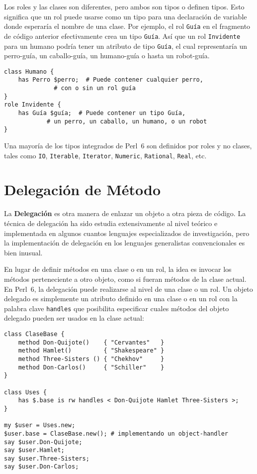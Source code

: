 Los roles y las clases son diferentes, pero ambos son tipos
o definen tipos. Esto significa que un rol puede usarse como
un tipo para una declaración de variable donde esperaría el 
nombre de una clase. Por ejemplo, el rol {\tt Guía} en el fragmento
de código anterior efectivamente crea un tipo {\tt Guía}. Así que
un rol {\tt Invidente} para un humano podría tener un atributo
de tipo {\tt Guía}, el cual representaría un perro-guía, un 
caballo-guía, un humano-guía o hasta un robot-guía.

\begin{verbatim}
class Humano {
    has Perro $perro;  # Puede contener cualquier perro,
    		  # con o sin un rol guía
}
role Invidente {
    has Guía $guía;  # Puede contener un tipo Guía, 
    	  	# un perro, un caballo, un humano, o un robot
}
\end{verbatim}


Una mayoría de los tipos integrados de Perl~6 son definidos
por roles y no clases, tales como {\tt IO}, {\tt Iterable}, 
{\tt Iterator}, {\tt Numeric}, {\tt Rational}, {\tt Real},
etc.

\section{Delegación de Método}


La {\bf Delegación} es otra manera de enlazar un objeto a otra pieza 
de código. La técnica de delegación ha sido estudia extensivamente 
al nivel teórico e implementada en algunos cuantos lenguajes 
especializados de investigación, pero la implementación de
delegación en los lenguajes generalistas convencionales
es bien inusual.

En lugar de definir métodos en una clase o en un rol, la idea 
es invocar los métodos perteneciente a otro objeto, como si fueran
métodos de la clase actual. En Perl~6, la delegación puede realizarse
al nivel de una clase o un rol. Un objeto delegado es simplemente
un atributo definido en una clase o en un rol con la palabra clave
{\tt handles} que posibilita especificar cuales métodos del objeto 
delegado pueden ser usados en la clase actual:

  
   
  
\begin{verbatim}
class ClaseBase {
    method Don-Quijote()    { "Cervantes"   }
    method Hamlet()         { "Shakespeare" }
    method Three-Sisters () { "Chekhov"     }
    method Don-Carlos()     { "Schiller"    }
}

class Uses { 
    has $.base is rw handles < Don-Quijote Hamlet Three-Sisters >;
}

my $user = Uses.new;
$user.base = ClaseBase.new(); # implementando un object-handler
say $user.Don-Quijote;
say $user.Hamlet;
say $user.Three-Sisters;
say $user.Don-Carlos;
\end{verbatim}

